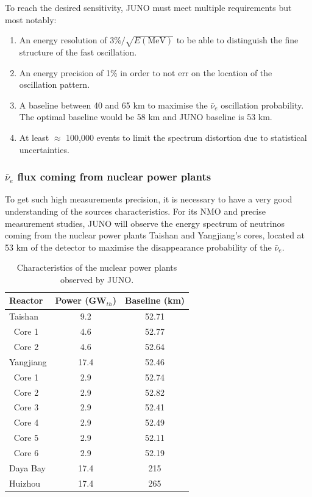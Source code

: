 \documentclass[../main.tex]{subfiles}
\begin{document}
To reach the desired sensitivity, JUNO must meet multiple requirements but most notably:
\begin{enumerate}
  \item An energy resolution of $3\%/\sqrt{E\mathrm{(MeV)}}$ to be able to distinguish the fine structure of the fast oscillation.
  \item An energy precision of 1\% in order to not err on the location of the oscillation pattern.
  \item A baseline between 40 and 65 km to maximise the $\bar{\nu}_e$ oscillation probability. The optimal baseline would be 58 km and JUNO baseline is 53 km.
  \item At least $\approx$ 100,000 events to limit the spectrum distortion due to statistical uncertainties.
\end{enumerate}

\subsubsection{$\bar{\nu}_e$ flux coming from nuclear power plants}
\label{sec:juno:nu_e_flux}

To get such high measurements precision, it is necessary to have a very good understanding of the sources characteristics. For its NMO and precise measurement studies, JUNO will observe the energy spectrum of neutrinos coming from the nuclear power plants Taishan and Yangjiang's cores, located at 53 km of the detector to maximise the disappearance probability of the $\bar{\nu}_e$.

\begin{table}[ht]
  \centering
  \begin{tabular}{l c c}
    \hline
    Reactor & Power (GW$_{th}$) & Baseline (km) \\
    \hline
    Taishan    & 9.2  & 52.71 \\
    $~$ Core 1 & 4.6  & 52.77 \\
    $~$ Core 2 & 4.6  & 52.64 \\
    Yangjiang  & 17.4 & 52.46 \\
    $~$ Core 1 & 2.9  & 52.74 \\
    $~$ Core 2 & 2.9  & 52.82 \\
    $~$ Core 3 & 2.9  & 52.41 \\
    $~$ Core 4 & 2.9  & 52.49 \\
    $~$ Core 5 & 2.9  & 52.11 \\
    $~$ Core 6 & 2.9  & 52.19 \\
    Daya Bay   & 17.4 & 215   \\
    Huizhou    & 17.4 & 265   \\
    \hline
  \end{tabular}
  \caption{Characteristics of the nuclear power plants observed by JUNO.}
  \label{tab:juno:power_plants}
\end{table}
\end{document}
